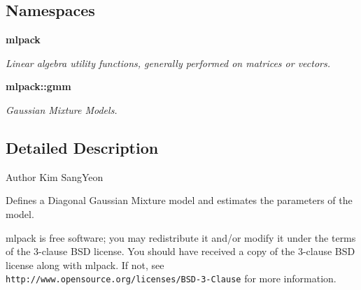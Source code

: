 \subsection*{Namespaces}
\begin{DoxyCompactItemize}
\item 
 \textbf{ mlpack}
\begin{DoxyCompactList}\small\item\em Linear algebra utility functions, generally performed on matrices or vectors. \end{DoxyCompactList}\item 
 \textbf{ mlpack\+::gmm}
\begin{DoxyCompactList}\small\item\em Gaussian Mixture Models. \end{DoxyCompactList}\end{DoxyCompactItemize}


\subsection{Detailed Description}
\begin{DoxyAuthor}{Author}
Kim Sang\+Yeon
\end{DoxyAuthor}
Defines a Diagonal Gaussian Mixture model and estimates the parameters of the model.

mlpack is free software; you may redistribute it and/or modify it under the terms of the 3-\/clause B\+SD license. You should have received a copy of the 3-\/clause B\+SD license along with mlpack. If not, see {\tt http\+://www.\+opensource.\+org/licenses/\+B\+S\+D-\/3-\/\+Clause} for more information. 